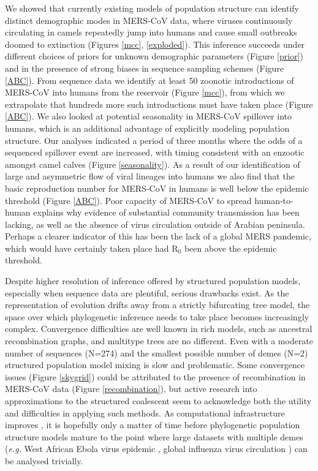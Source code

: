 \documentclass[11pt,oneside,letterpaper]{article}
\begin{document}
We showed that currently existing models of population structure \citep{vaughan_efficient_2014} can identify distinct demographic modes in MERS-CoV data, where viruses continuously circulating in camels repeatedly jump into humans and cause small outbreaks doomed to extinction (Figures \ref{mcc}, \ref{exploded}).
This inference succeeds under different choices of priors for unknown demographic parameters (Figure \ref{prior}) and in the presence of strong biases in sequence sampling schemes (Figure \ref{ABC}).
From sequence data we identify at least 50 zoonotic introductions of MERS-CoV into humans from the reservoir (Figure \ref{mcc}), from which we extrapolate that hundreds more such introductions must have taken place (Figure \ref{ABC}).
We also looked at potential seasonality in MERS-CoV spillover into humans, which is an additional advantage of explicitly modeling population structure.
Our analyses indicated a period of three months where the odds of a sequenced spillover event are increased, with timing consistent with an enzootic amongst camel calves (Figure \ref{seasonality}).
As a result of our identification of large and asymmetric flow of viral lineages into humans we also find that the basic reproduction number for MERS-CoV in humans is well below the epidemic threshold (Figure \ref{ABC}).
Poor capacity of MERS-CoV to spread human-to-human explains why evidence of substantial community transmission has been lacking, as well as the absence of virus circulation outside of Arabian peninsula.
Perhaps a clearer indicator of this has been the lack of a global MERS pandemic, which would have certainly taken place had R$_{0}$ been above the epidemic threshold.

Despite higher resolution of inference offered by structured population models, especially when sequence data are plentiful, serious drawbacks exist.
As the representation of evolution drifts away from a strictly bifurcating tree model, the space over which phylogenetic inference needs to take place becomes increasingly complex.
Convergence difficulties are well known in rich models, such as ancestral recombination graphs, and multitype trees are no different.
Even with a moderate number of sequences (N=274) and the smallest possible number of demes (N=2) structured population model mixing is slow and problematic.
Some convergence issues (Figure \ref{skygrid}) could be attributed to the presence of recombination in MERS-CoV data (Figure \ref{recombination}), but active research into approximations to the structured coalescent \citep{maio_new_2015} seem to acknowledge both the utility and difficulties in applying such methods.
As computational infrastructure improves \citep{ayres_beagle:_2012}, it is hopefully only a matter of time before phylogenetic population structure models mature to the point where large datasets with multiple demes (\textit{e.g.} West African Ebola virus epidemic \citep{dudas_virus_2017}, global influenza virus circulation \citep{bedford_global_2015}) can be analysed trivially.
\end{document}
